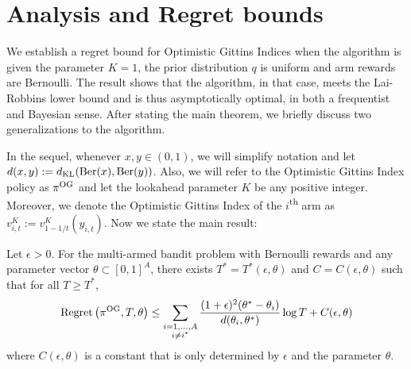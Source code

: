 \section{Analysis and Regret bounds} \label{sec:analysis_of_regret}
We establish a regret bound for Optimistic Gittins Indices when the algorithm is given the parameter $K = 1$, the prior distribution $q$ is uniform and arm rewards are Bernoulli. The result shows that the algorithm, in that case, meets the Lai-Robbins lower bound and is thus asymptotically optimal, in both a frequentist and Bayesian sense. After stating the main theorem, we briefly discuss two generalizations to the algorithm.

In the sequel, whenever $x,y \in (0,1)$, we will simplify notation  and let $d(x,y) := d_{\rm KL}(\text{Ber}(x),\text{Ber}(y))$. Also, we will refer to the Optimistic Gittins Index policy as $\pi^{\rm OG}$ and let the lookahead parameter $K$ be any positive integer. Moreover, we denote the Optimistic Gittins Index of the $i$\textsuperscript{th} arm as $v^K_{i,t} := v^K_{1-1/t}(y_{i,t})$. Now we state the main result:
\begin{theorem} \label{thm:frequentist_optimal_bound}
	Let $\epsilon > 0$. For the multi-armed bandit problem with Bernoulli rewards and any parameter vector $\theta \subset [0,1]^A$, there exists $T^* = T^*(\epsilon, \theta)$ and $C = C(\epsilon,\theta)$ such that for all $T \ge T^*$,
	\begin{equation}
	\textnormal{Regret} \left( \pi^{\rm OG}, T, \theta \right) \le \sum_{\substack{i=1,\ldots,A \\ i \ne i^*}} \frac{(1+\epsilon)^2(\theta^* - \theta_i)}{d(\theta_i, \theta^*)} \log T  + C(\epsilon,\theta)
	\end{equation}
	where $C(\epsilon,\theta)$ is a constant that is only determined by $\epsilon$ and the parameter $\theta$.
\end{theorem}
